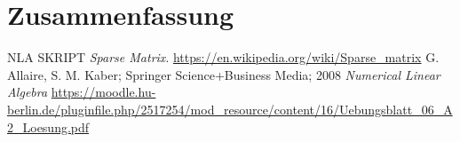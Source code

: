 \documentclass[smallheadings]{scrartcl}
\numberwithin{equation}{section}
\begin{document}
\section{Zusammenfassung}

\begin{thebibliography}{9}
 NLA SKRIPT \textit{Sparse Matrix}. 
\url{https://en.wikipedia.org/wiki/Sparse_matrix}
 G. Allaire, S. M. Kaber; Springer Science+Business Media; 2008 \textit{Numerical Linear Algebra}
\url{https://moodle.hu-berlin.de/pluginfile.php/2517254/mod_resource/content/16/Uebungsblatt_06_A2_Loesung.pdf}
\end{thebibliography}


\end{document}
